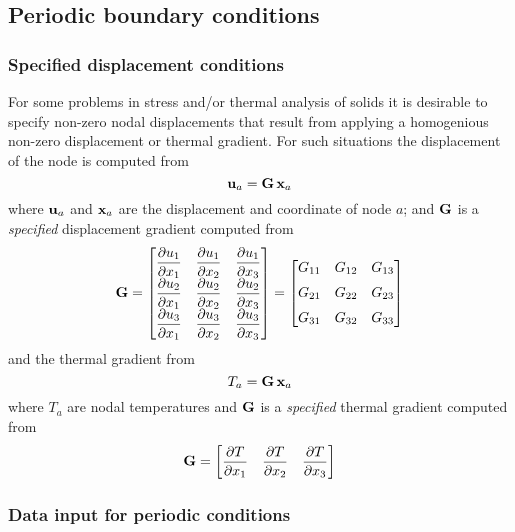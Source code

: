 \subsection{Periodic boundary conditions}
\label{periodicbc}

\subsubsection{Specified displacement conditions}

For some problems in stress and/or thermal analysis of solids
it is desirable to specify non-zero nodal displacements
that result from applying a homogenious non-zero displacement or
thermal gradient.  For such situations
the displacement of the node is computed from 
\begin{displaymath}
\mathbf{u}_a = \mathbf{G} \, \mathbf{x}_a
\end{displaymath}
where $\mathbf{u}_a$ and $\mathbf{x}_a$ are the displacement and coordinate of node $a$;
and $\mathbf{G}$ is a \textit{specified} displacement gradient computed from
\begin{displaymath}
\mathbf{G} = \begin{bmatrix}
\dfrac{\partial {u_1}}{\partial {x_1}} & \dfrac{\partial {u_1}}{\partial {x_2}} & \dfrac{\partial {u_1}}{\partial {x_3}} \\
\dfrac{\partial {u_2}}{\partial {x_1}} & \dfrac{\partial {u_2}}{\partial {x_2}} & \dfrac{\partial {u_2}}{\partial {x_3}} \\
\dfrac{\partial {u_3}}{\partial {x_1}} & \dfrac{\partial {u_3}}{\partial {x_2}} & \dfrac{\partial {u_3}}{\partial {x_3}} \end{bmatrix}
= \begin{bmatrix}
G_{11} & G_{12} & G_{13} \\[+6pt]
G_{21} & G_{22} & G_{23} \\[+6pt]
G_{31} & G_{32} & G_{33} \end{bmatrix}
\end{displaymath}
and the thermal gradient from
\begin{displaymath}
T_a = \mathbf{G} \, \mathbf{x}_a
\end{displaymath}
where $T_a$ are nodal temperatures and $\mathbf{G}$ is a \textit{specified}
thermal gradient computed from
\begin{displaymath}
\mathbf{G} = \begin{bmatrix}
\dfrac{\partial {T}}{\partial {x_1}} & \dfrac{\partial {T}}{\partial {x_2}} & \dfrac{\partial {T}}{\partial {x_3}} \end{bmatrix} 
\end{displaymath}

\subsubsection{Data input for periodic conditions}

